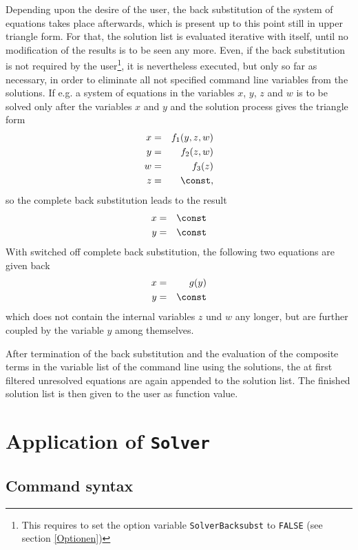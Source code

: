 Depending upon the desire of the user, the back substitution of the system of equations takes place afterwards, which is present up to this point still in upper triangle form. For that, the solution list is evaluated iterative with itself, until no modification of the results is to be seen any  more. Even, if the back substitution is not required by the user\footnote{This requires to set the option variable {\tt SolverBacksubst} to {\tt FALSE} (see section \ref{Optionen})}, it  is nevertheless executed, but only so far as necessary, in order to eliminate all not specified command line variables  from the solutions. If e.g. a system of equations
in the variables $x$, $y$, $z$ and $w$ is to be solved only after the variables $x$ and $y$  and the solution process gives  the triangle form
\begin{eqnarray}
x &=& f_1(y,z,w)\\
y &=& f_2(z,w)  \\
w &=& f_3(z)    \\
z &=& \const,
\end{eqnarray}
so the complete back substitution leads to the result
\begin{eqnarray}
x &=& \const \\
y &=& \const
\end{eqnarray}
With switched off complete back substitution, the following two equations are given back 
\begin{eqnarray}
x &=& g(y) \\
y &=& \const
\end{eqnarray}
which does not contain the internal variables $z$ und $w$ any longer, but are further coupled by the variable $y$ among themselves.

After termination of the back substitution and the evaluation of the composite terms in the variable list of the command line using the solutions, the at first filtered unresolved equations are again appended to the solution list. The finished solution list is then given to the user as function value.


\section{Application of {\tt Solver}}  %

\subsection{Command syntax}

